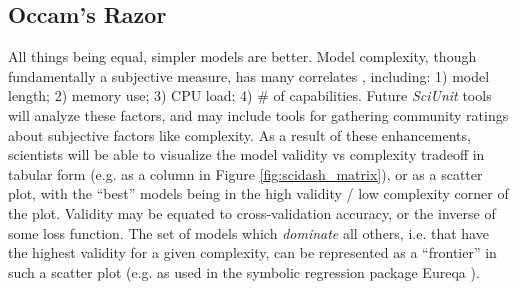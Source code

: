 \documentclass{frontiersSCNS}
\let\verbx\lstinline
\begin{document}

\subsection{Occam's Razor}
All things being equal, simpler models are better. 
Model complexity, though fundamentally a subjective measure, has many correlates \citep{mccabe_complexity_1976}, including: 
1) model length; 2) memory use; 3) CPU load; 4) \# of capabilities. 
Future \textit{SciUnit} tools will analyze these factors, and may include tools for gathering community ratings about subjective factors like complexity. As a result of these enhancements, scientists will be able to visualize the model validity vs complexity tradeoff in tabular form (e.g. as a column in Figure \ref{fig:scidash_matrix}), or as a scatter plot, with the ``best'' models being in the high validity / low complexity corner of the plot. 
Validity may be equated to cross-validation accuracy, or the inverse of some loss function.
The set of models which \textit{dominate} all others, i.e. that have the highest validity for a given complexity, can be represented as a ``frontier'' in such a scatter plot (e.g. as used in the symbolic regression package Eureqa \citep{schmidt_distilling_2009}).  
\end{document}

